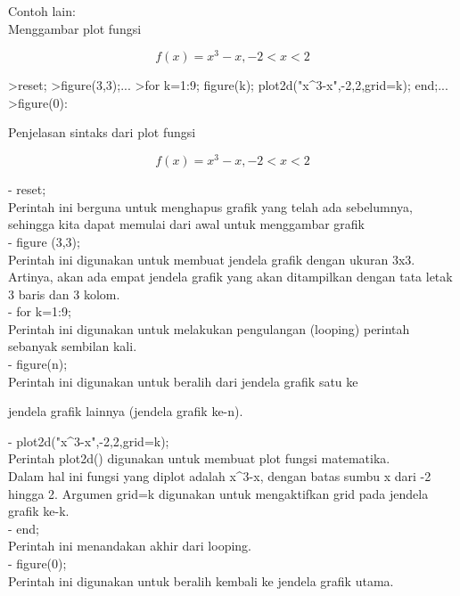 \documentclass[a4paper,10pt]{article}
\begin{document}
\begin{eulernotebook}
\begin{eulercomment}
\begin{eulercomment}
\begin{eulercomment}
Contoh lain:\\
Menggambar plot fungsi\\
\end{eulercomment}
\begin{eulerformula}
\[
f(x)=x^3-x, -2<x<2
\]
\end{eulerformula}
\begin{eulerprompt}
>reset;
>figure(3,3);...
>for k=1:9; figure(k); plot2d("x^3-x",-2,2,grid=k); end;...
>figure(0):
\end{eulerprompt}
\begin{eulerttcomment}
 Penjelasan sintaks dari plot fungsi
\end{eulerttcomment}
\begin{eulerformula}
\[
f(x)=x^3-x, -2<x<2
\]
\end{eulerformula}
\begin{eulercomment}
- reset;\\
Perintah ini berguna untuk menghapus grafik yang telah ada sebelumnya,
sehingga kita dapat memulai dari awal untuk menggambar grafik\\
- figure (3,3);\\
Perintah ini digunakan untuk membuat jendela grafik dengan ukuran 3x3.
Artinya, akan ada empat jendela grafik yang akan ditampilkan dengan
tata letak 3 baris dan 3 kolom.\\
- for k=1:9;\\
Perintah ini digunakan untuk melakukan pengulangan (looping) perintah
sebanyak sembilan kali.\\
- figure(n);\\
Perintah ini digunakan untuk beralih dari jendela grafik satu ke\\
\end{eulercomment}
\begin{eulerttcomment}
 jendela grafik lainnya (jendela grafik ke-n).
\end{eulerttcomment}
\begin{eulercomment}
- plot2d("x\textasciicircum{}3-x",-2,2,grid=k);\\
Perintah plot2d() digunakan untuk membuat plot fungsi matematika.\\
Dalam hal ini fungsi yang diplot adalah x\textasciicircum{}3-x, dengan batas sumbu x
dari -2 hingga 2. Argumen grid=k digunakan untuk mengaktifkan grid
pada jendela grafik ke-k.\\
- end;\\
Perintah ini menandakan akhir dari looping.\\
- figure(0);\\
Perintah ini digunakan untuk beralih kembali ke jendela grafik utama.


\end{eulercomment}
\end{eulercomment}
\end{eulercomment}
\end{eulernotebook}
\end{document}
